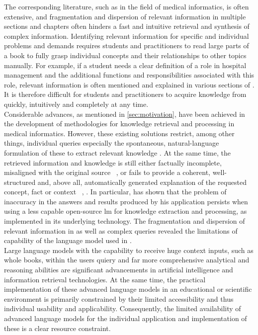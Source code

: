 The corresponding literature, such as \citet{bb2} in the field of medical informatics, is often extensive, and fragmentation and dispersion of relevant information in multiple sections and chapters often hinders a fast and intuitive retrieval and synthesis of complex information.
%
Identifying relevant information for specific and individual problems and demands requires students and practitioners to read large parts of a book to fully grasp individual concepts and their relationships to other topics manually.
%
For example, if a student needs a clear definition of a role in hospital management and the additional functions and responsibilities associated with this role, relevant information is often mentioned and explained in various sections of \citet{bb2}.\\
%
It is therefore difficult for students and practitioners to acquire knowledge from \citet{bb2} quickly, intuitively and completely at any time.\\
%
Considerable advances, as mentioned in \cref{sec:motivation}, have been achieved in the development of methodologies for knowledge retrieval and processing in medical informatics. 
%
However, these existing solutions restrict, among other things, individual queries especially the spontaneous, natural-language formulation of these to extract relevant knowledge \citet{snikquiz}.
At the same time, the retrieved information and knowledge is still either factually incomplete, misaligned with the original source ~\citep[cf.]{Paul_Keller}, or fails to provide a coherent, well-structured and, above all, automatically generated explanation of the requested concept, fact or context ~\citep[cf.]{snikquiz}, \citep[cf.]{hannesbell}.
In particular, \citet{Paul_Keller} has shown that the problem of inaccuracy in the answers and results produced by his application persists when using a less capable open-source \ac{lm} for knowledge extraction and processing, as implemented in its underlying technology.
The fragmentation and dispersion of relevant information in \citet{bb2} as well as complex queries revealed the limitations of capability of the language model used in \citet{Paul_Keller}.\\
Large language models with the capability to receive huge context inputs, such as whole books, within the users quiery and far more comprehensive analytical and reasoning abilities are significant advancements in artificial intelligence and information retrieval technologies.
At the same time, the practical implementation of these advanced language models in an educational or scientific environment is primarily constrained by their limited accessibility and thus individual usability and applicability.
Consequently, the limited availability of advanced language models for the individual application and implementation of these is a clear resource constraint. 
 
